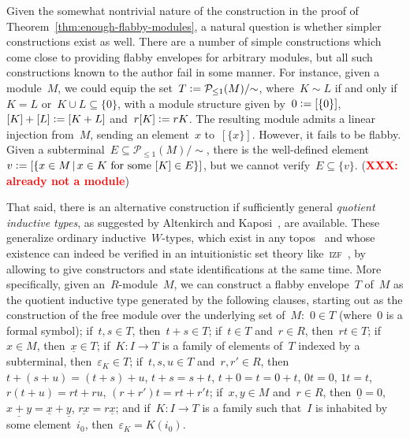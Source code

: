 \documentclass[oneside]{amsart}
\theoremstyle{definition}
\theoremstyle{plain}
\theoremstyle{remark}
\newcommand{\XXX}[1]{\textbf{\textcolor{red}{XXX: #1}}}
\renewcommand{\P}{\mathcal{P}}
\newcommand{\defeq}{\vcentcolon=}
\renewcommand{\_}{\mathpunct{.}\,}
\begin{document}
Given the somewhat nontrivial nature of the construction in the proof of
Theorem~\ref{thm:enough-flabby-modules}, a natural question is whether simpler
constructions exist as well.
There are a number of simple constructions which come close to providing
flabby envelopes for arbitrary modules, but all such constructions known to the
author fail in some manner. For instance, given a module~$M$, we could equip the set~$T
\defeq \P_{\leq1}(M)/{\sim}$, where~$K \sim L$ if and only if~$K = L$ or~$K
\cup L \subseteq \{0\}$, with a module structure given by~$0 \defeq [\{0\}]$,
$[K]+[L] \defeq [K+L]$ and~$r [K] \defeq rK$. The resulting module admits a
linear injection from~$M$, sending an element~$x$ to~$[\{x\}]$. However, it
fails to be flabby. Given a subterminal~$E \subseteq \P_{\leq1}(M)/{\sim}$,
there is the well-defined element~$v \defeq [\{x \in M\,|\,\text{$x \in K$ for
some~$[K] \in E$}\}]$, but we cannot verify~$E \subseteq \{v\}$.
(\XXX{already not a module})

That said, there is an alternative construction if sufficiently general
\emph{quotient inductive types}, as suggested by Altenkirch and
Kaposi~\cite{altenkirch-kaposi:qits}, are available. These generalize ordinary
inductive~$W$-types, which exist in any
topos~\cite{moerdijk-palmgren:wellfounded-trees,berg-moerdijk:w-types-in-sheaves,berg-kouwenhoven-gentil:w-types-in-eff}
and whose existence
can indeed be verified in an intuitionistic set theory like~\textsc{izf}~\cite{crosilla:cst-izf}, by allowing to
give constructors and state identifications at the same time. More
specifically, given an~$R$-module~$M$, we can construct a flabby envelope~$T$
of~$M$ as the quotient inductive type generated by the following clauses,
starting out as the construction of the free module over the underlying set
of~$M$:~$0
\in T$ (where~$0$ is a formal symbol); if~$t,s \in T$, then~$t + s \in T$;
if~$t \in T$ and~$r \in R$, then~$rt \in T$; if~$x \in M$, then~$\underline{x}
\in T$; if~$K : I \to T$ is a family of elements of~$T$ indexed by a subterminal, then~$\varepsilon_K \in T$;
if~$t,s,u \in T$ and~$r,r' \in R$, then~$t + (s + u) = (t + s) + u$, $t + s = s + t$, $t + 0 = t
= 0 + t$, $0t = 0$, $1t = t$, $r(t+u) = rt + ru$, $(r+r')t = rt + r't$; if~$x,y
\in M$ and~$r \in R$, then~$\underline{0} = 0$, $\underline{x + y} =
\underline{x} + \underline{y}$, $\underline{rx} = r \underline{x}$; and if~$K :
I \to T$ is a family such that~$I$ is inhabited by some element~$i_0$,
then~$\varepsilon_{K} = K(i_0)$.
\end{document}
